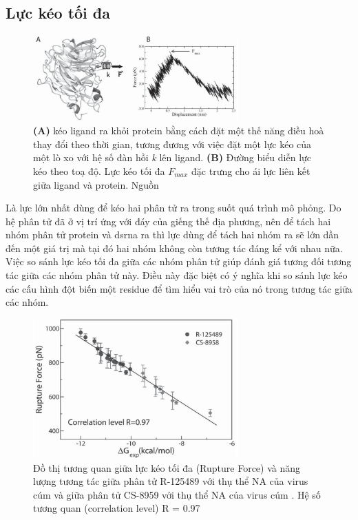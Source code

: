 \documentclass[12pt,a4paper,reqno, oneside]{book}
\begin{document}
	\subsection{Lực kéo tối đa}
	\begin{figure}[t!]
	\centering
	\includegraphics[width=0.7\textwidth,natwidth=610,natheight=642]{pull-force}
	\caption{\textbf{(A)} kéo ligand ra khỏi protein bằng cách đặt một thế năng điều hoà thay đổi theo thời gian, tương đương với việc đặt một lực kéo của một lò xo với hệ số đàn hồi \textit{k} lên ligand. \textbf{(B)} Đường biểu diễn lực kéo theo toạ độ. Lực kéo tối đa $F_{max}$ đặc trưng cho ái lực liên kết giữa ligand và protein. Nguồn \cite{SuanLi2012}}
	\label{fig:rupture-force}
	\end{figure}
	Là lực lớn nhất dùng để kéo hai phân tử ra trong suốt quá trình mô phỏng. Do hệ phân tử đã ở vị trí ứng với đáy của giếng thế địa phương, nên để tách hai nhóm phân tử protein và \gls{dsrna} ra thì lực dùng để tách hai nhóm ra sẽ lớn dần đến một giá trị mà tại đó hai nhóm không còn tương tác đáng kể với nhau nữa.
	Việc so sánh lực kéo tối đa giữa các nhóm phân tử giúp đánh giá tương đối tương tác giữa các nhóm phân tử này. Điều này đặc biệt có ý nghĩa khi so sánh lực kéo các cấu hình đột biến một \gls{residue} để tìm hiểu vai trò của nó trong tương tác giữa các nhóm.
	\begin{figure}[h!]
	\centering
	\includegraphics[width=0.7\textwidth,natwidth=610,natheight=642]{rupture_force-delta_G}
	\caption{Đồ thị tương quan giữa lực kéo tối đa (Rupture Force) và năng lượng tương tác giữa phân tử R-125489 với thụ thể NA của virus cúm và giữa phân tử CS-8959 với thụ thể NA của virus cúm \cite{SuanLi2012}. Hệ số tương quan (correlation level) R = 0.97}
	\label{fig:rupture-force-delta-g}
	\end{figure}
\end{document}
